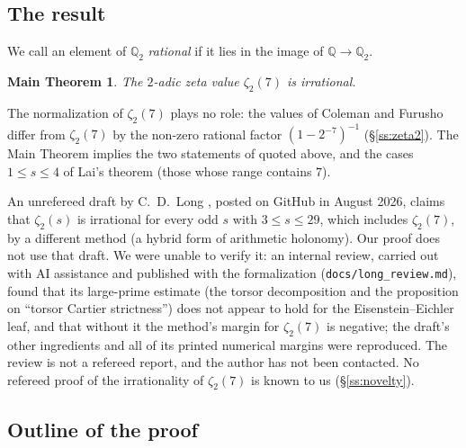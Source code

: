 \documentclass{amsart}
\newtheorem*{mainthm}{Main Theorem}
\theoremstyle{definition}
\theoremstyle{remark}
\numberwithin{equation}{section}
\newcommand{\Q}{\mathbb{Q}}
\begin{document}
\subsection{The result}\label{ss:result}

We call an element of $\Q_2$ \emph{rational} if it lies in the image of
$\Q\to\Q_2$.

\begin{mainthm}
The $2$-adic zeta value $\zeta_2(7)$ is irrational.
\end{mainthm}

The normalization of $\zeta_2(7)$ plays no role: the values of Coleman
\cite{Col82} and Furusho \cite{Fur04} differ from $\zeta_2(7)$ by the non-zero
rational factor $(1-2^{-7})^{-1}$ (\S\ref{ss:zeta2}). The Main Theorem implies
the two statements of \cite{Dev26,DevPair26} quoted above, and the cases
$1\le s\le4$ of Lai's theorem (those whose range contains $7$).

An unrefereed draft by C.~D.~Long \cite{Lon26a}, posted on GitHub in August
2026, claims that $\zeta_2(s)$ is irrational for every odd $s$ with
$3\le s\le29$, which includes $\zeta_2(7)$, by a different method (a hybrid
form of arithmetic holonomy). Our proof does not use that draft. We were
unable to verify it: an internal review, carried out with AI assistance and
published with the formalization (\texttt{docs/long\_review.md}), found that its
large-prime estimate (the torsor decomposition and the proposition on ``torsor
Cartier strictness'') does not appear to hold for the Eisenstein--Eichler leaf,
and that without it the method's margin for $\zeta_2(7)$ is negative; the
draft's other ingredients and all of its printed numerical margins were
reproduced. The review is not a refereed report, and the author has not been
contacted. No refereed proof of the irrationality of $\zeta_2(7)$ is known to
us (\S\ref{ss:novelty}).

\subsection{Outline of the proof}\label{ss:outline}
\end{document}
